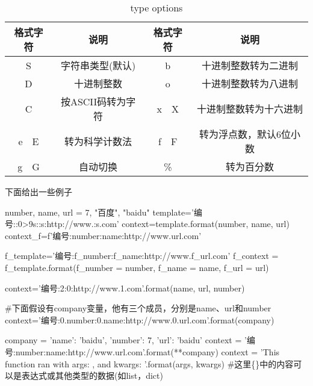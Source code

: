       \begin{table}[H]
        \centering
        \caption{type options}
        \label{tab:type options}
        \begin{tabular}{cccc}
          \toprule[1.5pt]
          格式字符 & 说明 & 格式字符 & 说明 \\
          \midrule
          S & 字符串类型(默认) & b & 十进制整数转为二进制 \\
          D & 十进制整数 & o & 十进制整数转为八进制 \\
          C & 按ASCII码转为字符 & x~~X & 十进制整数转为十六进制 \\
          e~~E & 转为科学计数法 & f~~F & 转为浮点数，默认6位小数 \\
          g~~G & 自动切换 & \% & 转为百分数 \\
          \bottomrule[1.5pt]
        \end{tabular}
      \end{table}

      下面给出一些例子
      \begin{codeblock}[language=python, caption={examples of format string}]
        number, name, url = 7, "百度", "baidu"
        template='编号:{:0>9s}:{:s}:http://www.{:s}.com'
        context=template.format(number, name, url)
        context_f=f'编号:{number}:{name}:http://www.{url}.com'

        f_template='编号:{f_number}:{f_name}:http://www.{f_url}.com'
        f_context = f_template.format(f_number = number, f_name = name, f_url = url)

        context='编号:{2}:{0}:http://www.{1}.com'.format(name, url, number)

        #下面假设有company变量，他有三个成员，分别是name、url和number
        context='编号:{0.number}:{0.name}:http://www.{0.url}.com'.format(company)
      
        company = {'name': 'baidu', 'number': 7, 'url': 'baidu'}
        context = '编号:{number}:{name}:http://www.{url}.com'.format(**company)
        context = 'This function ran with args: {}, and kwargs: {}'.format(args, kwargs)
        #这里\{\}中的内容可以是表达式或其他类型的数据(如list，dict)
      \end{codeblock}

